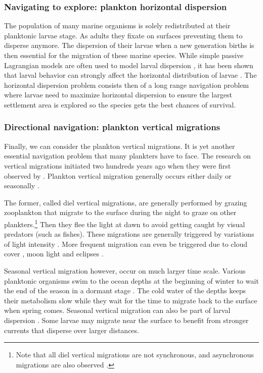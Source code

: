 \subsubsection{Navigating to explore: plankton horizontal dispersion}

The population of many marine organisms is solely redistributed at their planktonic larvae stage.
As adults they fixate on surfaces preventing them to disperse anymore.
The dispersion of their larvae when a new generation births is then essential for the migration of these marine species.
While simple passive Lagrangian models are often used to model larval dispersion \citep{siegel2003lagrangian}, it has been shown that larval behavior can strongly affect the horizontal distribution of larvae \citep{naylor2006orientation, vikebo2007drift, morgan2021robotic}.
The horizontal dispersion problem consists then of a long range navigation problem where larvae need to maximize horizontal dispersion to ensure the largest settlement area is explored so the species gets the best chances of survival.

\subsubsection{Directional navigation: plankton vertical migrations}

Finally, we can consider the plankton vertical migrations.
It is yet another essential navigation problem that many plankters have to face.
The research on vertical migrations initiated two hundreds years ago when they were first observed by \citet{cuvier1817regne}.
Plankton vertical migration generally occurs either daily or seasonally \citep{bandara2021two}.

The former, called diel vertical migrations, are generally performed by grazing zooplankton that migrate to the surface during the night to graze on other plankters.\footnote{Note that all diel vertical migrations are not synchronous, and asynchronous migrations are also observed \citep{cottier2006unsynchronised}.}
Then they flee the light at dawn to avoid getting caught by visual predators (such as fishes).
These migrations are generally triggered by variations of light intensity \citep{richards1996diel, van2013diel}. 
More frequent migration can even be triggered due to cloud cover \citep{omand2021cloud}, moon light \citep{last2016moonlight} and eclipses \citep{adhikari2018effect}.

Seasonal vertical migration however, occur on much larger time scale.
Various planktonic organisms swim to the ocean depths at the beginning of winter to wait the end of the season in a dormant stage \citep{naess1991diapausing, kaartvedt1996habitat}.
The cold water of the depths keeps their metabolism slow while they wait for the time to migrate back to the surface when spring comes.
Seasonal vertical migration can also be part of larval dispersion \citep{mcmanus2012plankton, kim1994larval, vikebo2007drift}.
Some larvae may migrate near the surface to benefit from stronger currents that disperse over larger distances.

